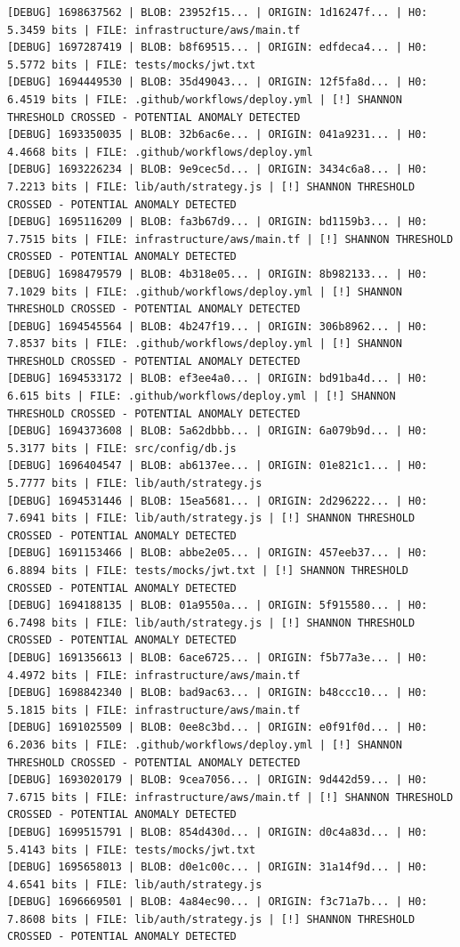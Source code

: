 \documentclass[12pt, a4paper, oneside]{report}
\begin{document}
\begin{lstlisting}[basicstyle=\tiny\ttfamily]
[DEBUG] 1698637562 | BLOB: 23952f15... | ORIGIN: 1d16247f... | H0: 5.3459 bits | FILE: infrastructure/aws/main.tf
[DEBUG] 1697287419 | BLOB: b8f69515... | ORIGIN: edfdeca4... | H0: 5.5772 bits | FILE: tests/mocks/jwt.txt
[DEBUG] 1694449530 | BLOB: 35d49043... | ORIGIN: 12f5fa8d... | H0: 6.4519 bits | FILE: .github/workflows/deploy.yml | [!] SHANNON THRESHOLD CROSSED - POTENTIAL ANOMALY DETECTED
[DEBUG] 1693350035 | BLOB: 32b6ac6e... | ORIGIN: 041a9231... | H0: 4.4668 bits | FILE: .github/workflows/deploy.yml
[DEBUG] 1693226234 | BLOB: 9e9cec5d... | ORIGIN: 3434c6a8... | H0: 7.2213 bits | FILE: lib/auth/strategy.js | [!] SHANNON THRESHOLD CROSSED - POTENTIAL ANOMALY DETECTED
[DEBUG] 1695116209 | BLOB: fa3b67d9... | ORIGIN: bd1159b3... | H0: 7.7515 bits | FILE: infrastructure/aws/main.tf | [!] SHANNON THRESHOLD CROSSED - POTENTIAL ANOMALY DETECTED
[DEBUG] 1698479579 | BLOB: 4b318e05... | ORIGIN: 8b982133... | H0: 7.1029 bits | FILE: .github/workflows/deploy.yml | [!] SHANNON THRESHOLD CROSSED - POTENTIAL ANOMALY DETECTED
[DEBUG] 1694545564 | BLOB: 4b247f19... | ORIGIN: 306b8962... | H0: 7.8537 bits | FILE: .github/workflows/deploy.yml | [!] SHANNON THRESHOLD CROSSED - POTENTIAL ANOMALY DETECTED
[DEBUG] 1694533172 | BLOB: ef3ee4a0... | ORIGIN: bd91ba4d... | H0: 6.615 bits | FILE: .github/workflows/deploy.yml | [!] SHANNON THRESHOLD CROSSED - POTENTIAL ANOMALY DETECTED
[DEBUG] 1694373608 | BLOB: 5a62dbbb... | ORIGIN: 6a079b9d... | H0: 5.3177 bits | FILE: src/config/db.js
[DEBUG] 1696404547 | BLOB: ab6137ee... | ORIGIN: 01e821c1... | H0: 5.7777 bits | FILE: lib/auth/strategy.js
[DEBUG] 1694531446 | BLOB: 15ea5681... | ORIGIN: 2d296222... | H0: 7.6941 bits | FILE: lib/auth/strategy.js | [!] SHANNON THRESHOLD CROSSED - POTENTIAL ANOMALY DETECTED
[DEBUG] 1691153466 | BLOB: abbe2e05... | ORIGIN: 457eeb37... | H0: 6.8894 bits | FILE: tests/mocks/jwt.txt | [!] SHANNON THRESHOLD CROSSED - POTENTIAL ANOMALY DETECTED
[DEBUG] 1694188135 | BLOB: 01a9550a... | ORIGIN: 5f915580... | H0: 6.7498 bits | FILE: lib/auth/strategy.js | [!] SHANNON THRESHOLD CROSSED - POTENTIAL ANOMALY DETECTED
[DEBUG] 1691356613 | BLOB: 6ace6725... | ORIGIN: f5b77a3e... | H0: 4.4972 bits | FILE: infrastructure/aws/main.tf
[DEBUG] 1698842340 | BLOB: bad9ac63... | ORIGIN: b48ccc10... | H0: 5.1815 bits | FILE: infrastructure/aws/main.tf
[DEBUG] 1691025509 | BLOB: 0ee8c3bd... | ORIGIN: e0f91f0d... | H0: 6.2036 bits | FILE: .github/workflows/deploy.yml | [!] SHANNON THRESHOLD CROSSED - POTENTIAL ANOMALY DETECTED
[DEBUG] 1693020179 | BLOB: 9cea7056... | ORIGIN: 9d442d59... | H0: 7.6715 bits | FILE: infrastructure/aws/main.tf | [!] SHANNON THRESHOLD CROSSED - POTENTIAL ANOMALY DETECTED
[DEBUG] 1699515791 | BLOB: 854d430d... | ORIGIN: d0c4a83d... | H0: 5.4143 bits | FILE: tests/mocks/jwt.txt
[DEBUG] 1695658013 | BLOB: d0e1c00c... | ORIGIN: 31a14f9d... | H0: 4.6541 bits | FILE: lib/auth/strategy.js
[DEBUG] 1696669501 | BLOB: 4a84ec90... | ORIGIN: f3c71a7b... | H0: 7.8608 bits | FILE: lib/auth/strategy.js | [!] SHANNON THRESHOLD CROSSED - POTENTIAL ANOMALY DETECTED
\end{lstlisting}
\end{document}
